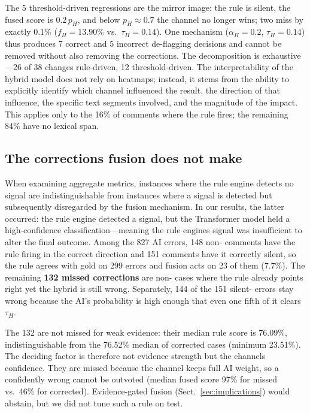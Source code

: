 The 5 threshold-driven regressions are the mirror image: the rule is silent, the
fused \hate{} score is $0.2\,p_H$, and below $p_H\approx0.7$ the \hate{} channel no
longer wins; two miss by exactly 0.1\% ($f_H=13.90\%$ vs.\ $\tau_H=0.14$). One
mechanism ($\alpha_H=0.2$, $\tau_H=0.14$) thus produces 7 correct and 5 incorrect
de-flagging decisions and cannot be removed without also removing the corrections.
The decomposition is exhaustive---26 of 38 changes rule-driven, 12
threshold-driven. The interpretability of the hybrid model does not rely on heatmaps; instead, it stems from the ability to explicitly identify which channel influenced the result, the direction of that influence, the specific text segments involved, and the magnitude of the impact. This applies only to the 16\% of comments where the rule fires; the remaining 84\% have no lexical span.

\subsection{The corrections fusion does not make}
\label{sec:missed}

When examining aggregate metrics, instances where the rule engine detects no signal are indistinguishable from instances where a signal is detected but subsequently disregarded by the fusion mechanism. In our results, the latter occurred: the rule engine detected a signal, but the Transformer model held a high-confidence \clean{} classification---meaning the rule engine\textquotesingle s signal was insufficient to alter the final outcome. Among the 827 AI errors, 148 non-\clean{}
comments have the rule firing in the correct direction and 151 \clean{} comments have
it correctly silent, so the rule agrees with gold on 299 errors and fusion acts on 23
of them (7.7\%). The remaining \textbf{132 missed corrections} are non-\clean{} cases
where the rule already points right yet the hybrid is still wrong. Separately, 144 of
the 151 silent-\clean{} errors stay wrong because the AI's \hate{} probability is high
enough that even one fifth of it clears $\tau_H$.

The 132 are not missed for weak evidence: their median rule \hate{} score is 76.09\%,
indistinguishable from the 76.52\% median of corrected cases (minimum 23.51\%). The deciding factor is therefore not evidence strength but the \clean{} channel\textquotesingle s confidence. They are missed because
the \clean{} channel keeps full AI weight, so a confidently wrong \clean{} cannot be
outvoted (median fused \clean{} score 97\% for missed vs.\ 46\% for corrected).
Evidence-gated fusion (Sect.~\ref{sec:implications}) would abstain, but we did not tune
such a rule on test.

